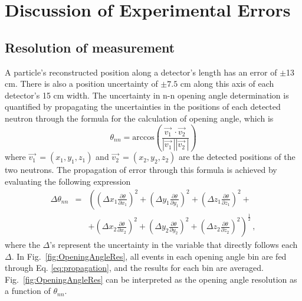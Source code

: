 \chapter{Discussion of Experimental Errors}
\label{Errors}
\thispagestyle{fancy}

\section{Resolution of measurement}
A particle's reconstructed position along a detector's length has an error of $\pm$13 cm.
There is also a position uncertainty of $\pm 7.5$ cm along this axis of each detector's 15 cm width.
The uncertainty in n-n opening angle determination is quantified by propagating the uncertainties in the positions of each detected neutron through the formula for the calculation of opening angle, which is
\begin{displaymath}
    \theta_{nn} = \text{arccos}\left(\frac{\vec{v_{1}}^{\,}\cdot\vec{v_{2}}^{\,}}{|\vec{v_{1}}^{\,}||\vec{v_{2}}^{\,}|}\right)
\end{displaymath}
where $\vec{v_{1}}^{\,} = (x_1,y_1,z_1)$ and $\vec{v_{2}}^{\,} = (x_2,y_2,z_2)$ are the detected positions of the two neutrons.
The propagation of error through this formula is achieved by evaluating the following expression
\begin{eqnarray}
\label{eq:propagation}
 \Delta \theta_{nn} & = & \left( \left(\Delta x_1 \frac{\partial \theta}{\partial x_1}\right)^{2} + \left(\Delta y_1 \frac{\partial \theta}{\partial y_1}\right)^{2} + \left(\Delta z_1 \frac{\partial \theta}{\partial z_1}\right)^{2} + \right. \\
 & & \left. + \left(\Delta x_2 \frac{\partial \theta}{\partial x_2}\right)^{2} + \left(\Delta y_2\frac{\partial \theta}{\partial y_2}\right)^{2} + \left(\Delta z_2 \frac{\partial \theta}{\partial z_2}\right)^{2} \right) ^{\frac{1}{2}} \, ,  \nonumber
\end{eqnarray}
where the $\Delta$'s represent the uncertainty in the variable that directly follows each $\Delta$.
In Fig.~\ref{fig:OpeningAngleRes}, all events in each opening angle bin are fed through Eq. \ref{eq:propagation}, and the results for each bin are averaged.
Fig.~\ref{fig:OpeningAngleRes} can be interpreted as the opening angle resolution as a function of $\theta_{nn}$.
